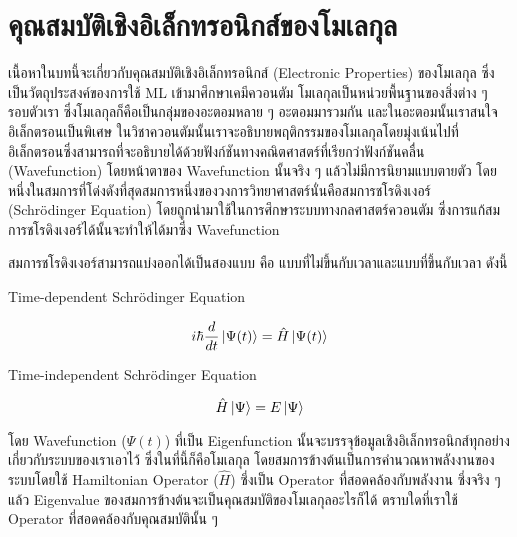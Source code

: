 

\chapter{คุณสมบัติเชิงอิเล็กทรอนิกส์ของโมเลกุล}
\label{ch:el_prop}

เนื้อหาในบทนี้จะเกี่ยวกับคุณสมบัติเชิงอิเล็กทรอนิกส์ (Electronic Properties) ของโมเลกุล ซึ่งเป็นวัตถุประสงค์ของการใช้ ML เข้ามาศึกษาเคมีควอนตัม
โมเลกุลเป็นหน่วยพื้นฐานของสิ่งต่าง ๆ รอบตัวเรา ซึ่งโมเลกุลก็คือเป็นกลุ่มของอะตอมหลาย ๆ อะตอมมารวมกัน และในอะตอมนั้นเราสนใจอิเล็กตรอนเป็นพิเศษ
ในวิชาควอนตัมนั้นเราจะอธิบายพฤติกรรมของโมเลกุลโดยมุ่งเน้นไปที่อิเล็กตรอนซึ่งสามารถที่จะอธิบายได้ด้วยฟังก์ชันทางคณิตศาสตร์ที่เรียกว่าฟังก์ชันคลื่น (Wavefunction)
โดยหน้าตาของ Wavefunction นั้นจริง ๆ แล้วไม่มีการนิยามแบบตายตัว โดยหนึ่งในสมการที่โด่งดังที่สุดสมการหนึ่งของวงการวิทยาศาสตร์นั่นคือสมการชโรดิงเงอร์ 
(Schrödinger Equation) โดยถูกนำมาใช้ในการศึกษาระบบทางกลศาสตร์ควอนตัม ซึ่งการแก้สมการชโรดิงเงอร์ได้นั้นจะทำให้ได้มาซึ่ง Wavefunction 

สมการชโรดิงเงอร์สามารถแบ่งออกได้เป็นสองแบบ คือ แบบที่ไม่ขึ้นกับเวลาและแบบที่ขึ้นกับเวลา ดังนี้

\noindent Time-dependent Schrödinger Equation

\begin{equation}
    i \hbar \frac{d}{d t} \ket{\Psi(t)} = \hat{H} \ket{\Psi(t)}
\end{equation}

\noindent Time-independent Schrödinger Equation

\begin{equation}
    \hat{H}\ket{\Psi} = E \ket{\Psi}
\end{equation}

โดย Wavefunction ($\Psi(t)$) ที่เป็น Eigenfunction นั้นจะบรรจุข้อมูลเชิงอิเล็กทรอนิกส์ทุกอย่างเกี่ยวกับระบบของเราเอาไว้ ซึ่งในที่นี้ก็คือโมเลกุล
โดยสมการข้างต้นเป็นการคำนวณหาพลังงานของระบบโดยใช้ Hamiltonian Operator ($\hat{H}$) ซึ่งเป็น Operator ที่สอดคล้องกับพลังงาน
ซึ่งจริง ๆ แล้ว Eigenvalue ของสมการข้างต้นจะเป็นคุณสมบัติของโมเลกุลอะไรก็ได้ ตราบใดที่เราใช้ Operator ที่สอดคล้องกับคุณสมบัตินั้น ๆ 

